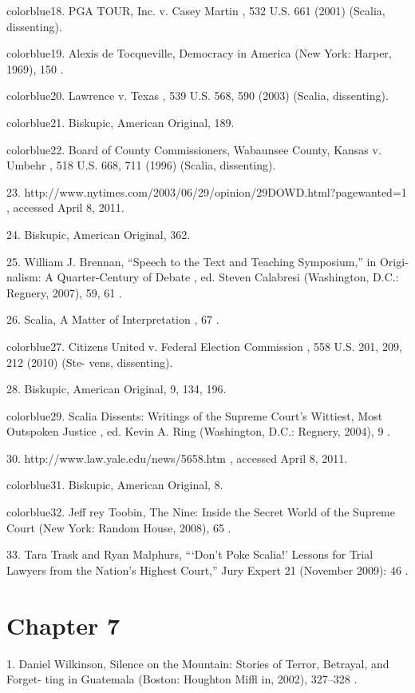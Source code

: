 	{color{blue}18}. PGA TOUR, Inc. v. Casey Martin , 532 U.S. 661 (2001) (Scalia, dissenting).


	{color{blue}19}. Alexis de Tocqueville, Democracy in America (New York: Harper, 1969), 150 .


	{color{blue}20}. Lawrence v. Texas , 539 U.S. 568, 590 (2003) (Scalia, dissenting).


	{color{blue}21}. Biskupic, American Original, 189.


	{color{blue}22}. Board of County Commissioners, Wabaunsee County, Kansas v. Umbehr , 518 U.S. 668, 711 (1996) (Scalia, dissenting).


	{\color{blue}23}. http://www.nytimes.com/2003/06/29/opinion/29DOWD.html?pagewanted=1 , accessed April 8, 2011.


	{\color{blue}24}. Biskupic, American Original, 362.


	{\color{blue}25}. William J. Brennan, “Speech to the Text and Teaching Symposium,” in Origi- nalism: A Quarter-Century of Debate , ed. Steven Calabresi (Washington, D.C.: Regnery, 2007), 59, 61 .


	{\color{blue}26}. Scalia, A Matter of Interpretation , 67 .


	{color{blue}27}. Citizens United v. Federal Election Commission , 558 U.S. 201, 209, 212 (2010) (Ste- vens, dissenting).


	{\color{blue}28}. Biskupic, American Original, 9, 134, 196.


	{color{blue}29}. Scalia Dissents: Writings of the Supreme Court’s Wittiest, Most Outspoken Justice , ed. Kevin A. Ring (Washington, D.C.: Regnery, 2004), 9 .


	{\color{blue}30}. http://www.law.yale.edu/news/5658.htm , accessed April 8, 2011.


	{color{blue}31}. Biskupic, American Original, 8.


	{color{blue}32}. Jeff rey Toobin, The Nine: Inside the Secret World of the Supreme Court (New York: Random House, 2008), 65 .


	{\color{blue}33}. Tara Trask and Ryan Malphurs, “‘Don’t Poke Scalia!’ Lessons for Trial Lawyers from the Nation’s Highest Court,” Jury Expert 21 (November 2009): 46 .


\section{Chapter 7}


	{\color{blue}1}. Daniel Wilkinson, Silence on the Mountain: Stories of Terror, Betrayal, and Forget- ting in Guatemala (Boston: Houghton Miffl in, 2002), 327–328 .


